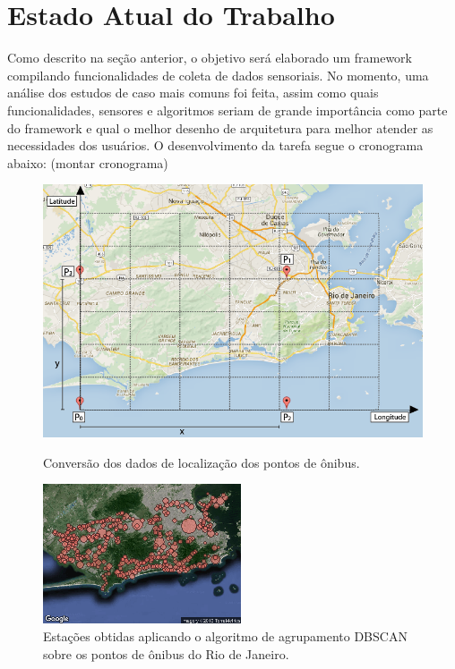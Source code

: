 \documentclass[12pt]{report} %
\begin{document}
\chapter{Estado Atual do Trabalho}
\label{sec:estado_atual}

Como descrito na seção anterior, o objetivo será elaborado um framework compilando funcionalidades de coleta de dados sensoriais. No momento, uma análise dos estudos de caso mais comuns foi feita, assim como quais funcionalidades, sensores e algoritmos seriam de grande importância como parte do framework e qual o melhor desenho de arquitetura para melhor atender as necessidades dos usuários. O desenvolvimento da tarefa segue o cronograma abaixo: (montar cronograma)

\begin{figure}[!ht]
	\centering
	\begin{minipage}[t]{0.49\textwidth}
		\includegraphics[width=\textwidth]{conversao.png}
		\caption
		{
			Conversão dos dados de localização dos pontos de ônibus.
		}
		\label{fig:conversao}
	\end{minipage}
	\hfill
	\begin{minipage}[t]{0.47\textwidth}
		\includegraphics[width=\textwidth]{stations-v3.png}
		\caption
		{
			Estações obtidas aplicando o algoritmo de agrupamento DBSCAN sobre os pontos de ônibus do Rio de Janeiro.
		}
		\label{fig:stacoes}
	\end{minipage}	
\end{figure}
\end{document}
